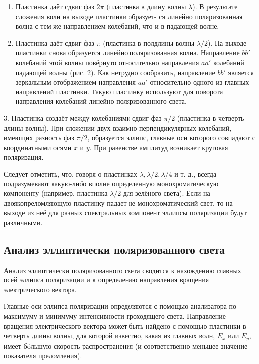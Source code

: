 \documentclass[14pt, a4paper]{report}
\begin{document}
 \begin{enumerate}
 		
 	\item Пластинка даёт сдвиг фаз $ 2\pi $ (пластинка в длину волны $ \lambda $). В результате сложения волн на выходе пластинки образует-
ся линейно поляризованная волна с тем же направлением колебаний, что и в падающей волне.

	\item Пластинка даёт сдвиг фаз $ \pi $ (пластинка в полдлины волны $ \lambda / 2 $). На выходе пластинки снова образуется линейно поляризованная волна. Направление $ bb' $ колебаний этой волны повёрнуто относительно направления $ aa' $ колебаний падающей волны (рис. 2). Как нетрудно сообразить, направление $ bb' $ является зеркальным отображением направления $ aa' $ относительно одного из главных направлений пластинки. Такую пластинку используют для поворота направления колебаний линейно поляризованного света.

 \end{enumerate}
 	
3.  Пластинка создаёт между колебаниями сдвиг фаз $ \pi/2 $ (пластинка
в четверть длины волны). При сложении двух взаимно перпендикулярных колебаний, имеющих разность фаз $ \pi/2 $, образуется эллипс, главные оси которого совпадают с координатными осями $ x $ и $ y $. При равенстве амплитуд возникает круговая поляризация.
 	


Следует отметить, что, говоря о пластинках $ \lambda , \lambda/2, \lambda/4  $ и т. д., всегда подразумевают какую-либо вполне определённую монохроматическую
компоненту (например, пластинка $ \lambda/2 $ для зелёного света). Если на двоякопреломляющую пластинку падает не монохроматический свет, то на
выходе из неё для разных спектральных компонент эллипсы поляризации будут различными.

\subsection{Анализ эллиптически поляризованного света}

Анализ эллиптически поляризованного света сводится к нахождению главных осей
эллипса поляризации и к определению направления вращения электрического вектора.

Главные оси эллипса поляризации определяются с помощью анализатора по максимуму и минимуму интенсивности проходящего света.
Направление вращения электрического вектора может быть найдено
с помощью пластинки в четверть длины волны, для которой известно,
какая из главных волн, $ E_x $ или $ E_y $, имеет б\'{o}льшую скорость распространения (и соответственно меньшее значение показателя преломления).
\end{document}
